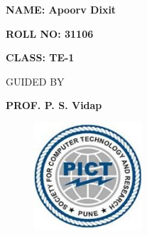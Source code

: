 \documentclass[12pt]{article}
\renewcommand{\_}{\kern-1.5pt\textunderscore\kern-1.5pt}
\begin{document}
\begin{Center}
{\fontsize{16pt}{19.2pt}\selectfont \textbf{NAME: Apoorv Dixit}\par}
\end{Center}\par

\begin{Center}
{\fontsize{16pt}{19.2pt}\selectfont \textbf{ROLL NO: 31106}\par}
\end{Center}\par

\begin{Center}
{\fontsize{16pt}{19.2pt}\selectfont \textbf{CLASS: TE-1}\par}
\end{Center}\par

\begin{Center}
{\fontsize{7pt}{8.4pt}\selectfont \textbf{ }\par}
\end{Center}\par

\begin{Center}
{\fontsize{14pt}{16.8pt}\selectfont GUIDED BY\par}
\end{Center}\par

\begin{Center}
{\fontsize{16pt}{19.2pt}\selectfont \textbf{PROF. P. S. Vidap}\par}
\end{Center}\par




\begin{figure}[H]
	\begin{Center}
		\includegraphics[width=1.57in,height=1.57in]{./media/image2.jpg}
	\end{Center}
\end{figure}
\end{document}
